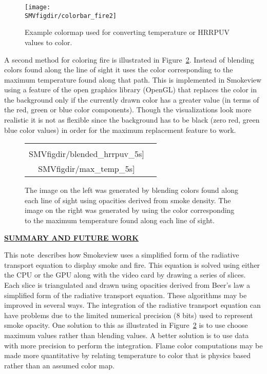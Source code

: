 \documentclass[11pt]{article}
\newcommand{\paper}{note}
\newcommand{\SMVfigdir}{../../../fig/smv/figures}
\newcommand{\ssection}[1]{\underline{\bf #1}}
\begin{document}
\begin{figure}[bph]
\begin{center}
\texttt{[image: \\SMVfigdir/colorbar\_fire2]}
\end{center}
\caption{Example colormap used for converting temperature or HRRPUV values to color.}
\label{fig:colormaps}
\end{figure}

A second method for coloring fire is illustrated in Figure~\ref{fig:blendedmaximages}.
Instead of blending colors found along the line of sight it uses the color corresponding to the maximum temperature found along that path. This is implemented in Smokeview using a feature of the open graphics library
(OpenGL)\cite{OpenGLRed}
that replaces the color in the background only if the currently drawn color has a greater value (in terms of the red, green or blue color components).  Though the visualizations look more realistic it is not as flexible since the background has to be black (zero red, green blue color values) in order for the maximum replacement feature to work.

\begin{figure}[bph]
\begin{center}
\begin{tabular}{cc}
\texttt{[image: \\SMVfigdir/blended\_hrrpuv\_5s]}&
\texttt{[image: \\SMVfigdir/max\_temp\_5s]}
\end{tabular}
\end{center}
\caption{The image on the left was generated by blending colors found along each line of sight using opacities derived from smoke density.  The image on the right was generated by using the color corresponding
to the maximum temperature found along each line of sight.}
\label{fig:blendedmaximages}
\end{figure}



\ssection{SUMMARY AND FUTURE WORK}

This \paper\ describes how Smokeview uses a simplified form of the radiative transport equation to display
smoke and fire. 
This equation is solved using either the CPU or the GPU along with the video card by drawing a series of slices. 
Each slice is triangulated and drawn using opacities derived from Beer's law a simplified form of the 
radiative transport equation.
These algorithms
may be improved in several ways. The integration of the radiative transport equation can have problems
due to the limited numerical precision (8 bits) used to represent smoke opacity.
One solution to this as illustrated in Figure~\ref{fig:blendedmaximages} is to use 
choose maximum values rather than blending values.  A better solution is to use data with
more precision to perform the integration. Flame color computations may be made more quantitative by
relating temperature to color that is physics based rather than an assumed
color map.



\end{document}
